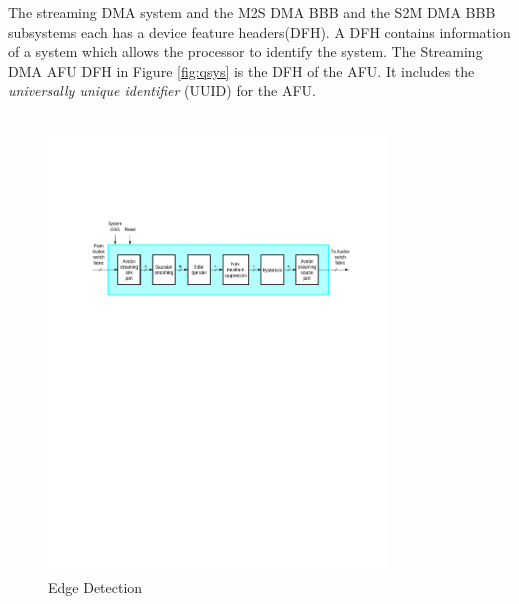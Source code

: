 \documentclass[epsfig,10pt,fullpage]{article}
\begin{document}
\noindent
The streaming DMA system and the M2S DMA BBB and the S2M DMA BBB subsystems each has a device feature headers(DFH). A DFH contains information of a system which allows the processor to identify the system. The Streaming DMA AFU DFH in Figure \ref{fig:qsys} is the DFH of the AFU. It includes the {\it universally unique identifier} (UUID) for the AFU.\\
\\
\begin{figure}[h]
    \centering
    \includegraphics[width=0.8\textwidth]{figures/blockdiagram.pdf}
    \caption{Edge Detection}
    \label{fig:edgeDetection}
\end{figure}
\end{document}
